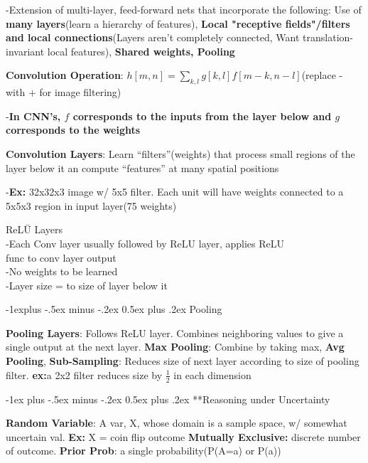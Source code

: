 \documentclass[10pt,landscape]{article}
\makeatletter
\renewcommand{\section}{\@startsection{section}{1}{0mm}%
                                {-1ex plus -.5ex minus -.2ex}%
                                {0.5ex plus .2ex}%
                                {\normalfont\normalsize\bfseries}}
\renewcommand{\subsection}{\@startsection{subsection}{2}{0mm}%
                                {-1explus -.5ex minus -.2ex}%
                                {0.5ex plus .2ex}%
                                {\normalfont\footnotesize\bfseries}}
\makeatother
\begin{document}
\begin{multicols}{3}
-Extension of multi-layer, feed-forward nets that incorporate the following: Use of \textbf{many layers}(learn a hierarchy of features), \textbf{Local "receptive fields"/filters and local connections}(Layers aren't completely connected, Want translation-invariant local features), \textbf{Shared weights, Pooling}

\textbf{Convolution Operation}: $h[m,n] = \sum_{k,l}g[k,l]f[m-k,n-l]$(replace - with + for image filtering)

-\textbf{In CNN's, $f$ corresponds to the inputs from the layer below and $g$ corresponds to the weights}

\textbf{Convolution Layers}: Learn ``filters''(weights) that process small regions of the layer below it an compute ``features'' at many spatial positions

-\textbf{Ex:} 32x32x3 image w/ 5x5 filter.  Each unit will have weights connected to a 5x5x3 region in input layer(75 weights)

\begin{tabbing}
ReL\=U Layers\\
\>-Each Conv layer usually followed by ReLU layer, applies ReLU \\\>func to conv layer output\\
\>-No weights to be learned\\
\>-Layer size = to size of layer below it\\
\end{tabbing}

\subsection{Pooling}

\textbf{Pooling Layers}: Follows ReLU layer.  Combines neighboring values to give a single output at the next layer. \textbf{Max Pooling}: Combine by taking max, \textbf{Avg Pooling}, \textbf{Sub-Sampling}: Reduces size of next layer according to size of pooling filter. \textbf{ex:}a 2x2 filter reduces size by $\frac{1}{2}$ in each dimension

\section{**Reasoning under Uncertainty}

\textbf{Random Variable}: A var, X, whose domain is a sample space, w/ somewhat uncertain val.  \textbf{Ex:} X = coin flip outcome \textbf{Mutually Exclusive:} discrete number of outcome. \textbf{Prior Prob}: a single probability(P(A=a) or P(a))


\end{multicols}
\end{document}
